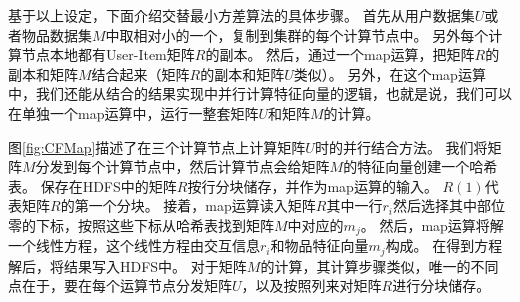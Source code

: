 基于以上设定，下面介绍交替最小方差算法的具体步骤。
首先从用户数据集$U$或者物品数据集$M$中取相对小的一个，复制到集群的每个计算节点中。
另外每个计算节点本地都有User-Item矩阵$R$的副本。
然后，通过一个map运算，把矩阵$R$的副本和矩阵$M$结合起来（矩阵$R$的副本和矩阵$U$类似）。
另外，在这个map运算中，我们还能从结合的结果实现中并行计算特征向量的逻辑，也就是说，我们可以在单独一个map运算中，运行一整套矩阵$U$和矩阵$M$的计算。
\begin{center}
\def\Machineone{
  \draw[rounded corners=1ex,color=blue!20!,fill=blue!20!] (0,0) rectangle (3,3);
  \draw[rounded corners=1ex,fill=white] (0.5,2) rectangle (2.5,2.5);
  \draw[fill=gray] (0.5,0.5) rectangle (1.8,1.5);
  \draw[fill=gray] (1,3.5) rectangle (2,4.5);
  \draw[->] (1.15,1.5) -- (1.15,2);
  \draw[->] (1.5,3) -- (1.5,3.5);
  \node at (1.5,2.25) {\textbf{Map}};
  \node at (1.15,1) [white] {$A(1)$};
  \node at (1.55,4) [white] {$U(1)$};
  \node at (1.5,-0.5) {Machine 1};
}
\def\Machinetwo{
  \draw[rounded corners=1ex,color=blue!20!,fill=blue!20!] (0,0) rectangle (3,3);
  \draw[rounded corners=1ex,fill=white] (0.5,2) rectangle (2.5,2.5);
  \draw[fill=gray] (0.5,0.5) rectangle (1.8,1.5);
  \draw[fill=gray] (1,3.5) rectangle (2,4.5);
  \draw[->] (1.15,1.5) -- (1.15,2);
  \draw[->] (1.5,3) -- (1.5,3.5);
  \node at (1.5,2.25) {\textbf{Map}};
  \node at (1.15,1) [white] {$A(2)$};
  \node at (1.55,4) [white] {$U(2)$};
  \node at (1.5,-0.5) {Machine 2};
}
\def\Machinethree{
  \draw[rounded corners=1ex,color=blue!20!,fill=blue!20!] (0,0) rectangle (3,3);
  \draw[rounded corners=1ex,fill=white] (0.5,2) rectangle (2.5,2.5);
  \draw[fill=gray] (0.5,0.5) rectangle (1.8,1.5);
  \draw[fill=gray] (1,3.5) rectangle (2,4.5);
  \draw[->] (1.15,1.5) -- (1.15,2);
  \draw[->] (1.5,3) -- (1.5,3.5);
  \node at (1.5,2.25) {\textbf{Map}};
  \node at (1.15,1) [white] {$A(3)$};
  \node at (1.55,4) [white] {$U(3)$};
  \node at (1.5,-0.5) {Machine 3};
}

\label{fig:CFMap}
\end{center}
图\ref{fig:CFMap}描述了在三个计算节点上计算矩阵$U$时的并行结合方法。
我们将矩阵$M$分发到每个计算节点中，然后计算节点会给矩阵$M$的特征向量创建一个哈希表。
保存在HDFS中的矩阵$R$按行分块储存，并作为map运算的输入。
$R(1)$代表矩阵$R$的第一个分块。
接着，map运算读入矩阵$R$其中一行$r_i$然后选择其中部位零的下标，按照这些下标从哈希表找到矩阵$M$中对应的$m_j$。
然后，map运算将解一个线性方程，这个线性方程由交互信息$r_i$和物品特征向量$m_j$构成。
在得到方程解后，将结果写入HDFS中。
对于矩阵$M$的计算，其计算步骤类似，唯一的不同点在于，要在每个运算节点分发矩阵$U$，以及按照列来对矩阵$R$进行分块储存。

